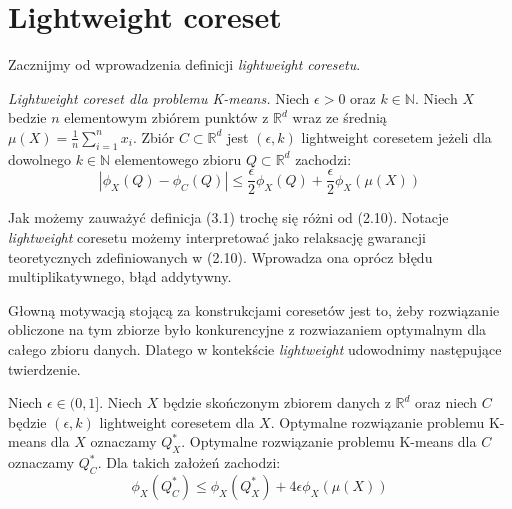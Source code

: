\section{Lightweight coreset}

Zacznijmy od wprowadzenia definicji \textit{lightweight coresetu}.
\begin{definition}
    \emph{Lightweight coreset dla problemu K-means.} Niech $\epsilon > 0$ oraz $k \in \mathbb{N}$.
    Niech $X$ bedzie $n$ elementowym zbiórem punktów z $\mathbb{R}^{d}$ wraz ze średnią $\mu(X) = \frac{1}{n}\sum_{i=1}^{n} x_{i}$.
    Zbiór $C \subset \mathbb{R}^d$ jest $(\epsilon, k)$ lightweight coresetem jeżeli dla dowolnego $k \in \mathbb{N}$ elementowego zbioru $Q \subset \mathbb{R}^{d}$ zachodzi:
    \begin{equation}
        |\phi_{X}(Q) - \phi_{C}(Q)| \leq \frac{\epsilon}{2}\phi_{X}(Q) + \frac{\epsilon}{2}\phi_{X}(\mu(X))
    \end{equation}
\end{definition}

\noindent
Jak możemy zauważyć definicja (3.1) trochę się różni od (2.10).
Notacje \textit{lightweight} coresetu możemy interpretować jako relaksację gwarancji teoretycznych zdefiniowanych w (2.10).
Wprowadza ona oprócz błędu multiplikatywnego, błąd addytywny.

Głowną motywacją stojącą za konstrukcjami coresetów jest to, żeby rozwiązanie obliczone na tym zbiorze było konkurencyjne z rozwiazaniem optymalnym dla całego zbioru danych.
Dlatego w kontekście \textit{lightweight} udowodnimy następujące twierdzenie.

\begin{thm}{\cite{bachem2017scalable}}
    Niech $\epsilon \in (0, 1]$. Niech $X$ będzie skończonym zbiorem danych z $\mathbb{R}^d$ oraz niech $C$ będzie $(\epsilon, k)$ lightweight coresetem dla $X$.
    Optymalne rozwiązanie problemu K-means dla $X$ oznaczamy $Q_{X}^{*}$.
    Optymalne rozwiązanie problemu K-means dla $C$ oznaczamy $Q_{C}^{*}$.
    Dla takich założeń zachodzi:
    \begin{equation}
        \phi_{X}(Q_{C}^{*}) \leq \phi_{X}(Q_{X}^{*}) + 4\epsilon\phi_{X}(\mu(X))
    \end{equation}
\end{thm}

